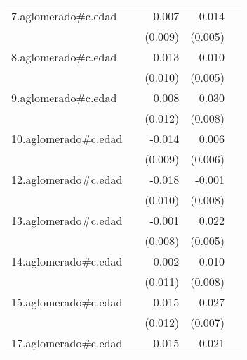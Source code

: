 {\begin{longtable}{l*{4}{D{.}{.}{-1}}}
\addlinespace
7.aglomerado#c.edad&                     &       0.007         &       0.014\sym{**} &                     \\
            &                     &     (0.009)         &     (0.005)         &                     \\
\addlinespace
8.aglomerado#c.edad&                     &       0.013         &       0.010         &                     \\
            &                     &     (0.010)         &     (0.005)         &                     \\
\addlinespace
9.aglomerado#c.edad&                     &       0.008         &       0.030\sym{***}&                     \\
            &                     &     (0.012)         &     (0.008)         &                     \\
\addlinespace
10.aglomerado#c.edad&                     &      -0.014         &       0.006         &                     \\
            &                     &     (0.009)         &     (0.006)         &                     \\
\addlinespace
12.aglomerado#c.edad&                     &      -0.018         &      -0.001         &                     \\
            &                     &     (0.010)         &     (0.008)         &                     \\
\addlinespace
13.aglomerado#c.edad&                     &      -0.001         &       0.022\sym{***}&                     \\
            &                     &     (0.008)         &     (0.005)         &                     \\
\addlinespace
14.aglomerado#c.edad&                     &       0.002         &       0.010         &                     \\
            &                     &     (0.011)         &     (0.008)         &                     \\
\addlinespace
15.aglomerado#c.edad&                     &       0.015         &       0.027\sym{***}&                     \\
            &                     &     (0.012)         &     (0.007)         &                     \\
\addlinespace
17.aglomerado#c.edad&                     &       0.015         &       0.021         &                     \\

\end{longtable}}
